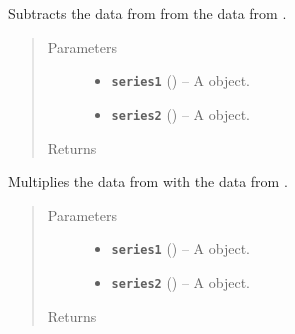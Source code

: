 \documentclass[letterpaper,10pt,openany,oneside]{sphinxmanual}
\begin{document}

\begin{fulllineitems}
\label{additional_functions:fredpy.minus}
Subtracts the data from  from the data from .
\begin{quote}\begin{description}
\item[{Parameters}] \leavevmode\begin{itemize}
\item {} 
\textbf{\texttt{series1}} ({\hyperref[series_class:fredpy.series]{}}) -- A  object.

\item {} 
\textbf{\texttt{series2}} ({\hyperref[series_class:fredpy.series]{}}) -- A  object.

\end{itemize}

\item[{Returns}] \leavevmode
{\hyperref[series_class:fredpy.series]{}}

\end{description}\end{quote}

\end{fulllineitems}


\begin{fulllineitems}
\label{additional_functions:fredpy.times}
Multiplies the data from  with the data from .
\begin{quote}\begin{description}
\item[{Parameters}] \leavevmode\begin{itemize}
\item {} 
\textbf{\texttt{series1}} ({\hyperref[series_class:fredpy.series]{}}) -- A  object.

\item {} 
\textbf{\texttt{series2}} ({\hyperref[series_class:fredpy.series]{}}) -- A  object.

\end{itemize}

\item[{Returns}] \leavevmode
{\hyperref[series_class:fredpy.series]{}}

\end{description}\end{quote}

\end{fulllineitems}
\end{document}
